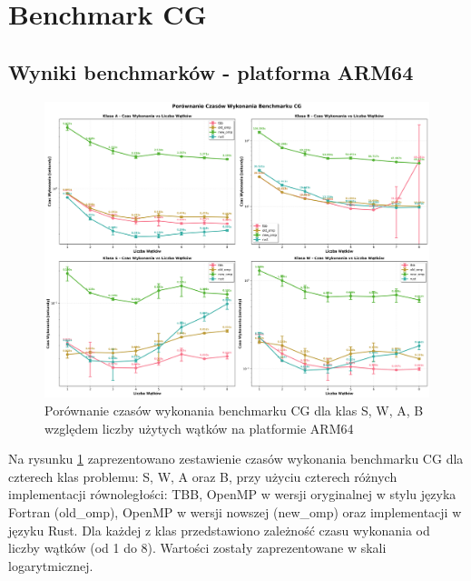 
\section{Benchmark CG}
\subsection{Wyniki benchmarków - platforma ARM64}

\begin{figure}[H]
    \centering
    \includegraphics[width=\textwidth]{analiza/images/parallel/cg/arm/cg_porownanie_czasow_wykonania.png}
    \caption{Porównanie czasów wykonania benchmarku CG dla klas S, W, A, B względem liczby użytych wątków na platformie ARM64}
    \label{cg_porownanie_czasow_wykonania}
\end{figure}

Na rysunku \ref{cg_porownanie_czasow_wykonania} zaprezentowano zestawienie czasów wykonania benchmarku CG dla czterech klas problemu: S, W, A oraz B, przy użyciu czterech różnych implementacji równoległości: TBB, OpenMP w wersji oryginalnej w stylu języka Fortran (old\_omp), OpenMP w wersji nowszej (new\_omp) oraz implementacji w języku Rust. Dla każdej z klas przedstawiono zależność czasu wykonania od liczby wątków (od 1 do 8). Wartości zostały zaprezentowane w skali logarytmicznej.

